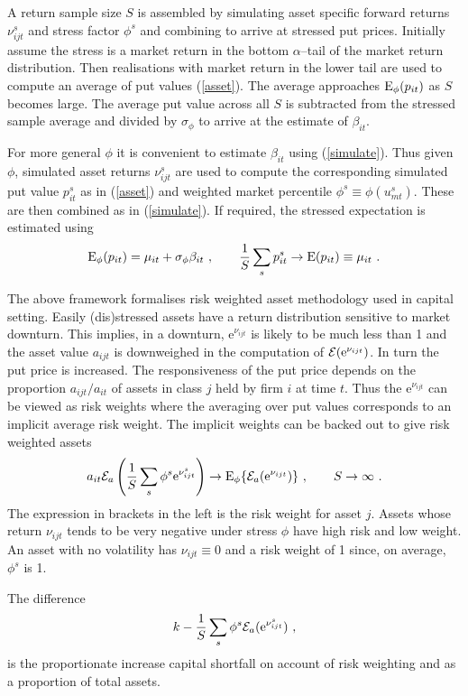 \documentclass[authoryear]{elsarticle}
\newcommand{\E}{\mathrm{E}}
\newcommand{\e}{\mathrm{e}}
\newcommand{\Ex}{{\cal E}}
\newcommand{\eref}[1]{(\ref{#1})}
\newcommand{\cq}{\ , \qquad}
\newcommand{\be}[1]{\begin{equation}\label{#1}}
\newcommand{\ee}{\end{equation}}
\begin{document}
A return sample size $S$ is assembled by simulating asset specific forward returns $\nu^s_{ijt}$ and  stress factor $\phi^s$ and combining to arrive at stressed put prices.   Initially assume the stress  is a market return in the bottom $\alpha$--tail of the market return  distribution.   Then realisations with market return in the lower tail  are used to compute an average  of put values \eref{asset}.  The average approaches $\Es(p_{it})$ as $S$ becomes large.   The average put value across all $S$ is  subtracted from the stressed sample average and divided by $\sigma_\phi$  to arrive at the estimate of $\beta_{it}$. 

For more general $\phi$ it is  convenient to estimate $\beta_{it}$ using \eref{simulate}.   Thus given $\phi$, simulated asset returns $\nu_{ijt}^s$ are used to compute the corresponding simulated put value $p_{it}^s$ as in \eref{asset} and weighted market percentile $\phi^s\equiv \phi(u^s_{mt})$.   These are then combined as in \eref{simulate}.   If required, the stressed expectation is estimated using 
$$
\Es(p_{it}) = \mu_{it} + \sigma_\phi\beta_{it}\cq  \frac{1}{S}\sum_s p_{it}^s\rightarrow \E(p_{it})\equiv \mu_{it}\ .
$$

The above framework formalises risk weighted asset methodology  used in capital setting.   Easily (dis)stressed assets have a return distribution sensitive to market downturn.   This implies, in a downturn, $\e^{\nu_{ijt}}$ is likely to be much less than 1 and the asset value $a_{ijt}$ is downweighed in the computation of $\Ex(\e^{\nu_{ijt}})$.  In turn the put price is increased.  The responsiveness of the put price depends on the proportion $a_{ijt}/a_{it}$ of assets in class $j$ held by firm $i$ at time $t$.   Thus the $\e^{\nu_{ijt}}$ can be viewed  as risk weights where the averaging over put values corresponds  to an implicit average risk weight.   The implicit weights can be backed out to give risk weighted assets
\be{rwa}
a_{it}\Ex_a\left( \frac{1}{S}\sum_s\phi^s\e^{\nu_{ijt}^s}\right)\rightarrow \Es\{\Ex_a(\e^{\nu_{ijt}})\}\cq S\rightarrow\infty \ .
\ee
The expression in  brackets in the left is the risk weight for asset $j$.   Assets whose return $\nu_{ijt}$  tends to be very negative under stress $\phi$ have high risk and low weight.  An asset with no volatility has $\nu_{ijt}\equiv 0$ and  a risk weight of 1 since, on average, $\phi^s$ is 1.

The difference
$$
k - \frac{1}{S}\sum_s\phi^s\Ex_a(\e^{\nu_{ijt}^s})\ ,
$$
is the proportionate increase capital shortfall on account of risk weighting and as a proportion of total assets.
\end{document}
